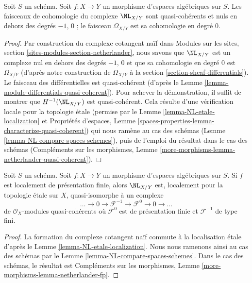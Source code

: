 \begin{lemma}
\label{lemma-netherlander-quasi-coherent}
Soit $S$ un schéma. Soit $f : X \to Y$ un morphisme
d'espaces algébriques sur $S$. Les faisceaux de cohomologie
du complexe $\NL_{X/Y}$ sont quasi-cohérents et nuls en dehors
des degrés $-1$, $0$ ; le faisceau $\Omega_{X/Y}$ est sa cohomologie en degré $0$.
\end{lemma}

\begin{proof}
Par construction du complexe cotangent naïf dans
Modules sur les sites, section \ref{sites-modules-section-netherlander},
nous savons que $\NL_{X/Y}$ est un complexe nul en dehors des degrés $-1$, $0$
et que sa cohomologie en degré $0$ est $\Omega_{X/Y}$ (d'après notre
construction de $\Omega_{X/Y}$ à la section \ref{section-sheaf-differentials}).
Le faisceau des différentielles est quasi-cohérent (d'après le
Lemme \ref{lemma-module-differentials-quasi-coherent}).
Pour achever la démonstration, il suffit de montrer que $H^{-1}(\NL_{X/Y})$
est quasi-cohérent. Cela résulte d'une vérification locale pour la topologie étale
(permise par le Lemme \ref{lemma-NL-etale-localization} et
Propriétés d'espaces, Lemme
\ref{spaces-properties-lemma-characterize-quasi-coherent})
qui nous ramène au cas des schémas
(Lemme \ref{lemma-NL-compare-spaces-schemes}),
puis de l'emploi du résultat dans le cas des schémas
(Compléments sur les morphismes, Lemme
\ref{more-morphisms-lemma-netherlander-quasi-coherent}).
\end{proof}

\begin{lemma}
\label{lemma-netherlander-fp}
Soit $S$ un schéma.
Soit $f : X \to Y$ un morphisme d'espaces algébriques sur $S$.
Si $f$ est localement de
présentation finie, alors $\NL_{X/Y}$ est, localement pour la topologie étale sur $X$,
quasi-isomorphe à un complexe
$$
\ldots \to 0 \to \mathcal{F}^{-1} \to \mathcal{F}^0 \to 0 \to \ldots
$$
de $\mathcal{O}_X$-modules quasi-cohérents
où $\mathcal{F}^0$ est de présentation finie
et $\mathcal{F}^{-1}$ de type fini.
\end{lemma}

\begin{proof}
La formation du complexe cotangent naïf commute à la
localisation étale d'après le Lemme \ref{lemma-NL-etale-localization}.
Nous nous ramenons ainsi au cas des schémas par le
Lemme \ref{lemma-NL-compare-spaces-schemes}.
Dans le cas des schémas, le résultat est
Compléments sur les morphismes, Lemme
\ref{more-morphisms-lemma-netherlander-fp}.
\end{proof}

